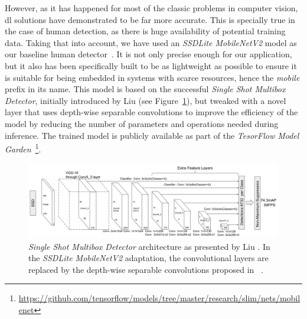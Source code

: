 However, as it has happened for most of the classic problems in computer vision, \gls{dl} solutions have demonstrated to be far more accurate. This is specially true in the case of human detection, as there is huge availability of potential training data. Taking that into account, we have used an \emph{SSDLite MobileNetV2} model as our baseline human detector~\cite{sandler2018mobilenetv2}. It is not only precise enough for our application, but it also has been specifically built to be as lightweight as possible to ensure it is suitable for being embedded in systems with scarce resources, hence the \emph{mobile} prefix in its name. This model is based on the successful \emph{Single Shot Multibox Detector}, initially introduced by Liu \etal\cite{liu2016ssd} (see Figure~\ref{fig:ssd}), but tweaked with a novel layer that uses depth-wise separable convolutions to improve the efficiency of the model by reducing the number of parameters and operations needed during inference. The trained model is publicly available as part of the \emph{TesorFlow Model Garden}~\footnote{\url{https://github.com/tensorflow/models/tree/master/research/slim/nets/mobilenet}}.

\begin{figure}[h]
    \centering
    \includegraphics[width=\textwidth]{figures/ssd.png}
    \caption{\emph{Single Shot Multibox Detector} architecture as presented by Liu \etal\cite{liu2016ssd}. In the \emph{SSDLite MobileNetV2} adaptation, the convolutional layers are replaced by the depth-wise separable convolutions proposed in ~\cite{sandler2018mobilenetv2}.}
    \label{fig:ssd}
\end{figure}


